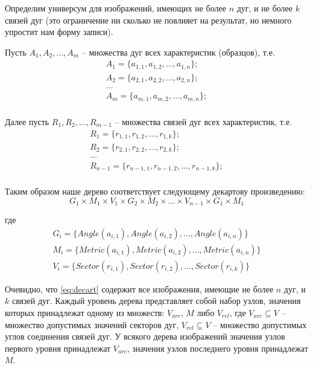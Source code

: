 Определим универсум для изображений, имеющих не более $n$ дуг, и не более $k$ связей дуг (это ограничение ни сколько не повлияет на результат, но немного упростит нам форму записи).

Пусть $A_1, A_2, ..., A_m$ – множества дуг всех характеристик (образцов), т.е.
\begin{equation}
\begin{array}{c}
A_1 = \{a_{1,1}, a_{1,2}, ..., a_{1,n}\}; \\
A_2 = \{ a_{2,1}, a_{2,2}, ..., a_{2,n}\}; \\
\dots \\
A_m = \{ a_{m,1}, a_{m,2}, ..., a_{m,n}\}; \\
\end{array}
\end{equation}

Далее пусть $R_1, R_2, ..., R_{m-1}$ – множества связей дуг всех характеристик, т.е. 
\begin{equation}
\begin{array}{c}
R_1 = \{r_{1,1}, r_{1,2}, ..., r_{1,k}\}; \\
R_2 = \{ r_{2,1}, r_{2,2}, ..., r_{2,k}\}; \\
\dots \\
R_{n-1} = \{ r_{{n-1},1}, r_{{n-1},2}, ..., r_{{n-1},k}\}; \\
\end{array}
\end{equation}

Таким образом наше дерево соответствует следующему декартову произведению:
\begin{equation}
G_1 \times M_1 \times V_1 \times G_2 \times M_2 \times ... \times V_{n-1} \times G_1 \times M_1
\label{eq:decart}
\end{equation}

где
\begin{equation}
\begin{array}{c}
G_i = \{Angle(a_{i,1}), Angle(a_{i,2}), ..., Angle(a_{i,n})\} \\
M_i = \{Metric(a_{i,1}), Metric(a_{i,2}), ..., Metric(a_{i,n})\} \\
V_i = \{Sector(r_{i,1}), Sector(r_{i,2}), ..., Sector(r_{i,k})\}
\end{array}
\end{equation}

Очевидно, что \ref{eq:decart} содержит все изображения, имеющие не более $n$ дуг, и $k$ связей дуг. Каждый уровень дерева представляет собой набор узлов, значения которых принадлежат одному из множеств: $V_{arc}$, $M$ либо $V_{rel}$, где $V_{arc} \subseteq V$ -- множество допустимых значений секторов дуг, $V_{rel} \subseteq V$ -- множество допустимых углов соединения связей дуг. У всякого дерева изображений значения узлов первого уровня принадлежат $V_{arc}$, значения узлов последнего уровня принадлежат $M$.

